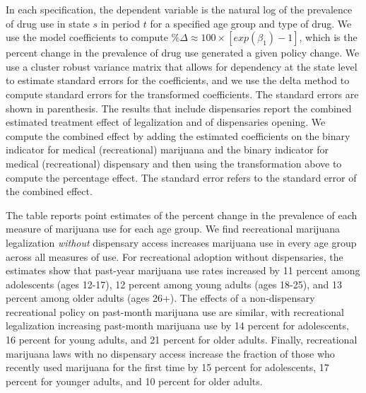 \documentclass[12pt]{article}%
\begin{document}
In each specification, the dependent variable is the natural log of the prevalence of drug use in state $s$ in period $t$ for a specified age group and type of drug. We use the model coefficients to compute $\% \Delta \approx 100\times \left[exp(\beta_1)-1\right]$, which is the percent change in the prevalence of drug use generated a given policy change.  We use a cluster robust variance matrix that allows for dependency at the state level to estimate standard errors for the coefficients, and we use the delta method to compute standard errors for the transformed coefficients. The standard errors are shown in parenthesis. The results that include dispensaries report the combined estimated treatment effect of legalization and  of dispensaries opening.  We compute the combined effect by adding the estimated coefficients on the binary indicator for medical (recreational) marijuana  and the binary indicator for medical (recreational) dispensary and then using the transformation above to compute the percentage effect. The standard error refers to the standard error of the combined effect. 

The table reports point estimates of the percent change in the prevalence of each measure of marijuana use for each age group. We find recreational marijuana legalization \emph{without} dispensary access increases marijuana use in every age group across all measures of use. For recreational adoption without dispensaries, the estimates show that past-year marijuana use rates increased by 11 percent among adolescents (ages 12-17), 12 percent among young adults (ages 18-25), and 13 percent among older adults (ages 26+). The effects of a non-dispensary recreational policy on past-month marijuana use are similar, with recreational legalization increasing past-month marijuana use by 14 percent for adolescents, 16 percent for young adults, and 21 percent for older adults. Finally, recreational marijuana laws with no dispensary access increase the fraction of those who recently used marijuana for the first time by 15 percent for adolescents, 17 percent for younger adults, and 10 percent for older adults. 
\end{document}
